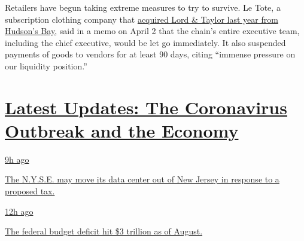 Retailers have begun taking extreme measures to try to survive. Le Tote,
a subscription clothing company that
\href{https://www.nytimes3xbfgragh.onion/2019/08/28/business/lord-taylor-sold-le-tote.html}{acquired
Lord \& Taylor last year from Hudson's Bay,} said in a memo on April 2
that the chain's entire executive team, including the chief executive,
would be let go immediately. It also suspended payments of goods to
vendors for at least 90 days, citing ``immense pressure on our liquidity
position.''

\hypertarget{latest-updates-the-coronavirus-outbreak-and-the-economy}{%
\section{\texorpdfstring{\href{https://www.nytimes3xbfgragh.onion/live/2020/09/11/business/stock-market-today-coronavirus?action=click\&pgtype=Article\&state=default\&region=MAIN_CONTENT_1\&context=storylines_live_updates}{Latest
Updates: The Coronavirus Outbreak and the
Economy}}{Latest Updates: The Coronavirus Outbreak and the Economy}}\label{latest-updates-the-coronavirus-outbreak-and-the-economy}}

\href{https://www.nytimes3xbfgragh.onion/live/2020/09/11/business/stock-market-today-coronavirus?action=click\&pgtype=Article\&state=default\&region=MAIN_CONTENT_1\&context=storylines_live_updates\#the-nyse-may-move-its-data-center-out-of-new-jersey-in-response-to-a-proposed-tax}{9h
ago}

\href{https://www.nytimes3xbfgragh.onion/live/2020/09/11/business/stock-market-today-coronavirus?action=click\&pgtype=Article\&state=default\&region=MAIN_CONTENT_1\&context=storylines_live_updates\#the-nyse-may-move-its-data-center-out-of-new-jersey-in-response-to-a-proposed-tax}{The
N.Y.S.E. may move its data center out of New Jersey in response to a
proposed tax.}

\href{https://www.nytimes3xbfgragh.onion/live/2020/09/11/business/stock-market-today-coronavirus?action=click\&pgtype=Article\&state=default\&region=MAIN_CONTENT_1\&context=storylines_live_updates\#the-federal-budget-deficit-hit-3-trillion-as-of-august}{12h
ago}

\href{https://www.nytimes3xbfgragh.onion/live/2020/09/11/business/stock-market-today-coronavirus?action=click\&pgtype=Article\&state=default\&region=MAIN_CONTENT_1\&context=storylines_live_updates\#the-federal-budget-deficit-hit-3-trillion-as-of-august}{The
federal budget deficit hit \$3 trillion as of August.}

